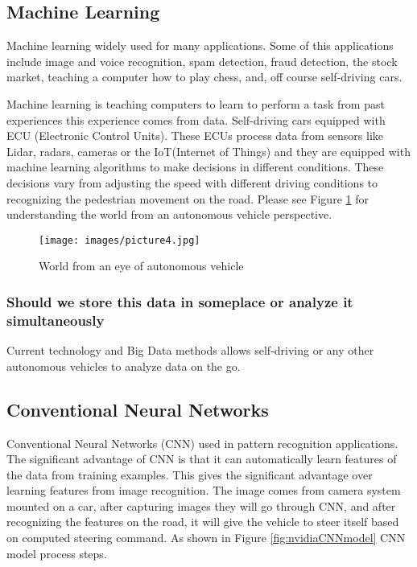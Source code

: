 \documentclass[sigconf]{acmart}
\begin{document}
\subsection{Machine Learning}

Machine learning widely used for many applications. Some of this applications include image and voice recognition, spam detection, fraud detection, the stock market, teaching a computer how to play chess, and, off course self-driving cars. 
\par Machine learning is teaching computers to learn to perform a task from past experiences this experience comes from data. Self-driving cars equipped with ECU (Electronic Control Units). These ECUs process data from sensors like Lidar, radars, cameras or the IoT(Internet of Things) and they are equipped with machine learning algorithms to make decisions in different conditions\cite{www-kdnuggets}. These decisions vary from adjusting the speed with different driving conditions to recognizing the pedestrian movement on the road. Please see Figure \ref{fig:Lidar} for understanding the world from an autonomous vehicle perspective\cite{www-digits-hbs}. 

\begin{figure}[!ht]
  \centering
      \texttt{[image: images/picture4.jpg]}
  \caption{World from an eye of autonomous vehicle}\label{fig:Lidar}
\end{figure}

\subsubsection{Should we store this data in someplace or analyze it simultaneously}
Current technology and Big Data methods allows self-driving or any other autonomous vehicles to analyze data on the go\cite{www-sas}.

\subsection{Conventional Neural Networks}

Conventional Neural Networks (CNN)\cite{nvidia} used in pattern recognition applications. The significant advantage of CNN is that it can automatically learn features of the data from training examples\cite{nvidia}. This gives the significant advantage over learning features from image recognition. The image comes from camera system mounted on a car, after capturing images they will go through CNN, and after recognizing the features on the road, it will give the vehicle to steer itself based on computed steering command\cite{nvidia}. As shown in Figure \ref{fig:nvidiaCNNmodel} CNN model process steps\cite{nvidia}. 
\end{document}

